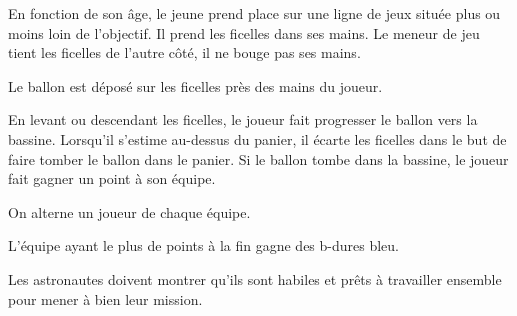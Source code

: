 \documentclass{grand-jeu}
\begin{document}
\begin{liste-materiel}
\end{liste-materiel}

\begin{regles}
En fonction de son âge, le jeune prend place sur une ligne de jeux située plus ou moins loin de l'objectif. Il prend les ficelles dans ses mains. Le meneur de jeu tient les ficelles de l'autre côté, il ne bouge pas ses mains.

Le ballon est déposé sur les ficelles près des mains du joueur.

En levant ou descendant les ficelles, le joueur fait progresser le ballon vers la bassine. Lorsqu'il s'estime au-dessus du panier, il écarte les ficelles dans le but de faire tomber le ballon dans le panier. Si le ballon tombe dans la bassine, le joueur fait gagner un point à son équipe.

On alterne un joueur de chaque équipe.

L'équipe ayant le plus de points à  la fin gagne des b-dures bleu.
 
\end{regles}

\begin{imaginaire}
Les astronautes doivent montrer qu'ils sont habiles et prêts à travailler ensemble pour mener à bien leur mission.  
\end{imaginaire}

\begin{moments-stop}
\end{moments-stop}
\end{document}
